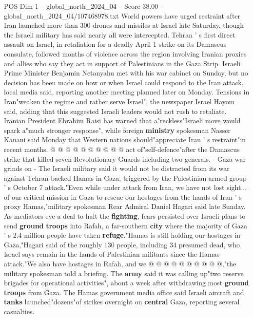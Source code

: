\begin{textsample}{POS Dim 1 – global\_north\_2024\_04 – Score 38.00 – global\_north\_2024\_04/107468978.txt}  \label{ex:f1_pos_199}
World powers have urged restraint after Iran launched more than 300 drones and missiles at Israel late Saturday, though the Israeli military has said nearly all were intercepted.
Tehran ' s first direct assault on Israel, in retaliation for a deadly April 1 strike on its Damascus consulate, followed months of violence across the region involving Iranian proxies and allies who say they act in support of Palestinians in the Gaza Strip.
Israeli Prime Minister Benjamin Netanyahu met with his war cabinet on Sunday, but no decision has been made on how or when Israel could respond to the Iran attack, local media said, reporting another meeting planned later on Monday.
Tensions in Iran"weaken the regime and rather serve Israel", the newspaper Israel Hayom said, adding that this suggested Israeli leaders would not rush to retaliate.
Iranian President Ebrahim Raisi has warned that a"reckless"Israeli move would spark a"much stronger response", while foreign \textbf{ministry} spokesman Nasser Kanani said Monday that Western nations should"appreciate Iran ' s restraint"in recent months. @ @ @ @ @ @ @ @ @ @ act of"self-defence"after the Damascus strike that killed seven Revolutionary Guards including two generals. - Gaza war grinds on - The Israeli military said it would not be distracted from its war against Tehran-backed Hamas in Gaza, triggered by the Palestinian armed group ' s October 7 attack."Even while under attack from Iran, we have not lost sight... of our critical mission in Gaza to rescue our hostages from the hands of Iran ' s proxy Hamas,"military spokesman Rear Admiral Daniel Hagari said late Sunday.
As mediators eye a deal to halt the \textbf{fighting}, fears persisted over Israeli plans to send \textbf{ground} \textbf{troops} into Rafah, a far-southern \textbf{city} where the majority of Gaza ' s 2.4 million people have taken \textbf{refuge}."Hamas is still holding our hostages in Gaza,"Hagari said of the roughly 130 people, including 34 presumed dead, who Israel says remain in the hands of Palestinian militants since the Hamas attack."We also have hostages in Rafah, and we @ @ @ @ @ @ @ @ @ @,"the military spokesman told a briefing.
The \textbf{army} said it was calling up"two reserve brigades for operational activities", about a week after withdrawing most \textbf{ground} \textbf{troops} from Gaza.
The Hamas government media office said Israeli aircraft and \textbf{tanks} launched"dozens"of strikes overnight on \textbf{central} Gaza, reporting several casualties.

\end{textsample}
